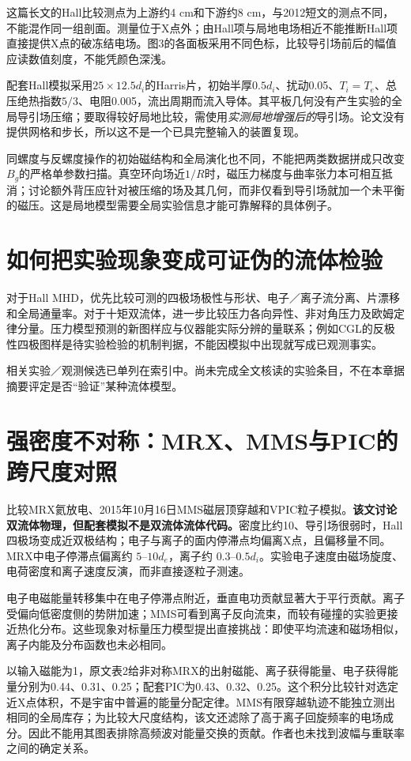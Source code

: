 这篇长文的Hall比较测点为上游约4 cm和下游约8 cm，与2012短文的测点不同，不能混作同一组剖面。测量位于X点外；由Hall项与局地电场相近不能推断Hall项直接提供X点的破冻结电场。图3的各面板采用不同色标，比较导引场前后的幅值应读数值刻度，不能凭颜色深浅。

配套Hall模拟采用$25\times12.5d_i$的Harris片，初始半厚$0.5d_i$、扰动0.05、$T_i=T_e$、总压绝热指数$5/3$、电阻0.005，流出周期而流入导体。其平板几何没有产生实验的全局导引场压缩；要取得较好局地比较，需使用\emph{实测局地增强后的}导引场。论文没有提供网格和步长，所以这不是一个已具完整输入的装置复现。

同螺度与反螺度操作的初始磁结构和全局演化也不同，不能把两类数据拼成只改变$B_g$的严格单参数扫描。真空环向场近$1/R$时，磁压力梯度与曲率张力本可相互抵消；讨论额外背压应针对被压缩的场及其几何，而非仅看到导引场就加一个未平衡的磁压。这是局地模型需要全局实验信息才能可靠解释的具体例子。

\section{如何把实验现象变成可证伪的流体检验}
对于Hall MHD，优先比较可测的四极场极性与形状、电子／离子流分离、片漂移和全局通量率。对于十矩双流体，进一步比较压力各向异性、非对角压力及欧姆定律分量。压力模型预测的新图样应与仪器能实际分辨的量联系；例如CGL的反极性四极图样是待实验检验的机制判据，不能因模拟中出现就写成已观测事实。\citep{Cassak2015}

相关实验／观测候选已单列在索引中。尚未完成全文核读的实验条目，不在本章据摘要评定是否“验证”某种流体模型。

\section{强密度不对称：MRX、MMS与PIC的跨尺度对照}
\citet{Yamada2018}比较MRX氦放电、2015年10月16日MMS磁层顶穿越和VPIC粒子模拟。\textbf{该文讨论双流体物理，但配套模拟不是双流体流体代码。}密度比约10、导引场很弱时，Hall四极场变成近双极结构；电子与离子的面内停滞点均偏离X点，且偏移量不同。MRX中电子停滞点偏离约 $5$--$10d_e$，离子约 $0.3$--$0.5d_i$。实验电子速度由磁场旋度、电荷密度和离子速度反演，而非直接逐粒子测速。

电子电磁能量转移集中在电子停滞点附近，垂直电功贡献显著大于平行贡献。离子受偏向低密度侧的势阱加速；MMS可看到离子反向流束，而较有碰撞的实验更接近热化分布。这些现象对标量压力模型提出直接挑战：即使平均流速和磁场相似，离子内能及分布函数也未必相同。

以输入磁能为1，原文表2给非对称MRX的出射磁能、离子获得能量、电子获得能量分别为0.44、0.31、0.25；配套PIC为0.43、0.32、0.25。这个积分比较针对选定近X点体积，不是宇宙中普遍的能量分配定律。MMS有限穿越轨迹不能独立测出相同的全局库存；为比较大尺度结构，该文还滤除了高于离子回旋频率的电场成分。因此不能用其图表排除高频波对能量交换的贡献。作者也未找到波幅与重联率之间的确定关系。

